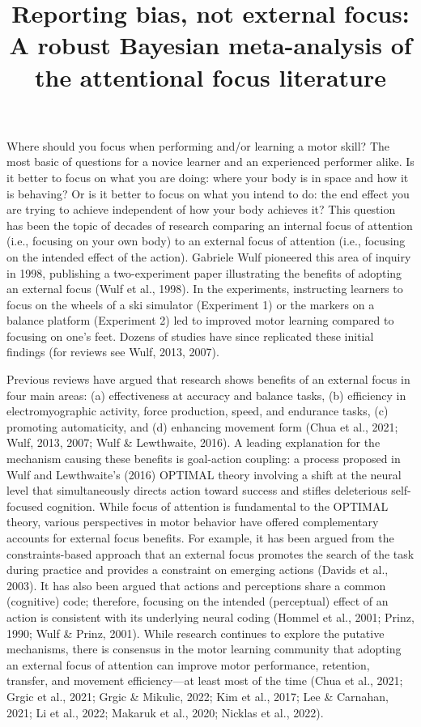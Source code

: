 \documentclass[
  11pt,
  doc, donotrepeattitle,floatsintext]{apa7}
\title{Reporting bias, not external focus: A robust Bayesian meta-analysis of the attentional focus literature}
\author{\phantom{0}}
\date{}
\affiliation{\phantom{0}}
\begin{document}
\maketitle

Where should you focus when performing and/or learning a motor skill? The most basic of questions for a novice learner and an experienced performer alike. Is it better to focus on what you are doing: where your body is in space and how it is behaving? Or is it better to focus on what you intend to do: the end effect you are trying to achieve independent of how your body achieves it? This question has been the topic of decades of research comparing an internal focus of attention (i.e., focusing on your own body) to an external focus of attention (i.e., focusing on the intended effect of the action). Gabriele Wulf pioneered this area of inquiry in 1998, publishing a two-experiment paper illustrating the benefits of adopting an external focus (Wulf et al., 1998). In the experiments, instructing learners to focus on the wheels of a ski simulator (Experiment 1) or the markers on a balance platform (Experiment 2) led to improved motor learning compared to focusing on one's feet. Dozens of studies have since replicated these initial findings (for reviews see Wulf, 2013, 2007).

Previous reviews have argued that research shows benefits of an external focus in four main areas: (a) effectiveness at accuracy and balance tasks, (b) efficiency in electromyographic activity, force production, speed, and endurance tasks, (c) promoting automaticity, and (d) enhancing movement form (Chua et al., 2021; Wulf, 2013, 2007; Wulf \& Lewthwaite, 2016). A leading explanation for the mechanism causing these benefits is goal-action coupling: a process proposed in Wulf and Lewthwaite's (2016) OPTIMAL theory involving a shift at the neural level that simultaneously directs action toward success and stifles deleterious self-focused cognition. While focus of attention is fundamental to the OPTIMAL theory, various perspectives in motor behavior have offered complementary accounts for external focus benefits. For example, it has been argued from the constraints-based approach that an external focus promotes the search of the task during practice and provides a constraint on emerging actions (Davids et al., 2003). It has also been argued that actions and perceptions share a common (cognitive) code; therefore, focusing on the intended (perceptual) effect of an action is consistent with its underlying neural coding (Hommel et al., 2001; Prinz, 1990; Wulf \& Prinz, 2001). While research continues to explore the putative mechanisms, there is consensus in the motor learning community that adopting an external focus of attention can improve motor performance, retention, transfer, and movement efficiency---at least most of the time (Chua et al., 2021; Grgic et al., 2021; Grgic \& Mikulic, 2022; Kim et al., 2017; Lee \& Carnahan, 2021; Li et al., 2022; Makaruk et al., 2020; Nicklas et al., 2022).
\end{document}
